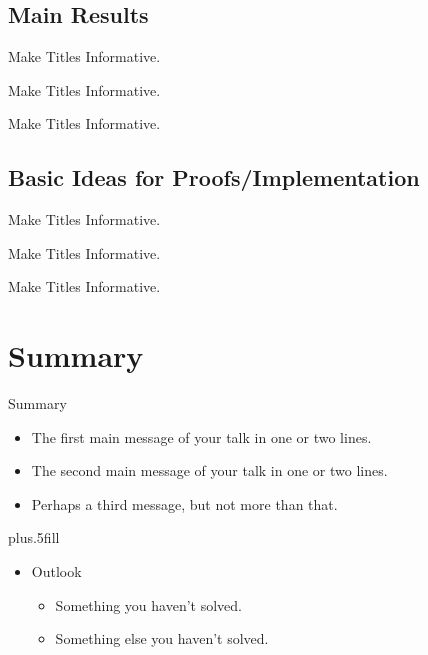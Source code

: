 \documentclass{beamer}
\begin{document}
\subsection{Main Results}

\begin{frame}{Make Titles Informative.}
\end{frame}

\begin{frame}{Make Titles Informative.}
\end{frame}

\begin{frame}{Make Titles Informative.}
\end{frame}


\subsection{Basic Ideas for Proofs/Implementation}

\begin{frame}{Make Titles Informative.}

\end{frame}

\begin{frame}{Make Titles Informative.}
\end{frame}

\begin{frame}{Make Titles Informative.}
\end{frame}



\section*{Summary}

\begin{frame}{Summary}

  \begin{itemize}
  \item
    The \alert{first main message} of your talk in one or two lines.
  \item
    The \alert{second main message} of your talk in one or two lines.
  \item
    Perhaps a \alert{third message}, but not more than that.
  \end{itemize}
  
  \vskip0pt plus.5fill
  \begin{itemize}
  \item
    Outlook
    \begin{itemize}
    \item
      Something you haven't solved.
    \item
      Something else you haven't solved.
    \end{itemize}
  \end{itemize}
\end{frame}
\end{document}
